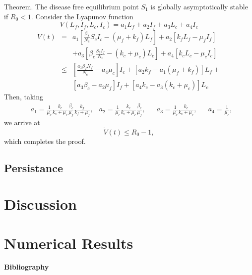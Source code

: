 \documentclass[preprint,12pt]{elsarticle}
\begin{document}
\noindent Theorem. The disease free equilibrium point $S_1$ is globally asymptotically stable if $R_0<1$.
Consider the Lyapunov function
$$V(L_f,I_f,L_c,I_c)=a_1L_f+a_2I_f+a_3L_c+a_4I_c$$
$$
\begin{array}{lll}
\dot{V}(t)&=&a_1\left[\frac{\beta_f}{N_c}S_cI_c-(\mu_f+k_f)L_f\right]+a_2\left[k_fL_f-\mu_fI_f\right]\\
&&+a_3\left[ \beta_c\frac{S_cI_f}{N_c}-(k_c+\mu_c)L_c\right]+a_4\left[k_cL_c-\mu_cI_c\right]\\
&\leq& \left[\frac{a_1\beta_fN_f}{N_c}-a_4\mu_c\right]I_c+\left[a_2k_f-a_1(\mu_f+k_f)\right]L_f+\\
&&\left[a_3\beta_c-a_2\mu_f\right]I_f+\left[a_4k_c-a_3(k_c+\mu_c)\right]L_c
\end{array}
$$
Then, taking 
\begin{align*}
    & a_1=
        \frac{1}{\mu_c}\frac{k_c}{k_c+\mu_c}
        \frac{\beta_c}{\mu_f}\frac{k_f}{k_f+\mu_f},
    & a_2=
        \frac{1}{\mu_c}\frac{k_c}{k_c+\mu_c}\frac{\beta_c}{\mu_f},
    &
    & a_3=
        \frac{1}{\mu_c}\frac{k_c}{k_c+\mu_c},
    &
    & a_4=
        \frac{1}{\mu_c}, 
\end{align*}
we arrive at
\begin{equation}
    \dot{V}(t) 
        \leq  R_0 - 1,
\end{equation}
which completes the proof.

\subsection{Persistance}

\section{Discussion}

\section{Numerical Results}

    

\textbf{Bibliography}


\end{document}
